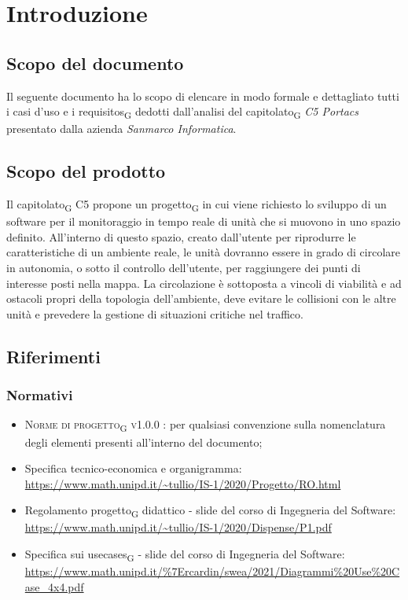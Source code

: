 \section{Introduzione}
\subsection{Scopo del documento}
Il seguente documento ha lo scopo di elencare in modo formale e dettagliato tutti i casi d’uso e i \glspl{requisito}\textsubscript{G} dedotti dall’analisi del \gls{capitolato}\textsubscript{G} \textit{C5 Portacs} presentato dalla azienda \textit{Sanmarco Informatica}.

\subsection{Scopo del prodotto}
Il \gls{capitolato}\textsubscript{G} C5 propone un \gls{progetto}\textsubscript{G} in cui viene richiesto lo sviluppo di un software per il monitoraggio in tempo reale di unità che si muovono in uno spazio definito. All’interno di questo spazio, creato dall’utente per riprodurre le caratteristiche di un ambiente reale, le unità dovranno essere in grado di circolare in autonomia, o sotto il controllo dell’utente, per raggiungere dei punti di interesse posti nella mappa.  La circolazione è sottoposta a vincoli di viabilità e ad ostacoli propri della topologia dell’ambiente, deve evitare le collisioni con le altre unità e prevedere la gestione di situazioni critiche nel traffico.

\subsection{Riferimenti}
\subsubsection{Normativi}
\begin{itemize}
\item \textsc{Norme di \gls{progetto}\textsubscript{G} v1.0.0 }: per qualsiasi convenzione sulla nomenclatura degli elementi presenti all’interno del documento;
\item Specifica tecnico-economica e organigramma: \\ \url{https://www.math.unipd.it/~tullio/IS-1/2020/Progetto/RO.html}
\item Regolamento \gls{progetto}\textsubscript{G} didattico - slide del corso di Ingegneria del Software: \\ \url{https://www.math.unipd.it/~tullio/IS-1/2020/Dispense/P1.pdf}
\item Specifica sui \glspl{usecase}\textsubscript{G} - slide del corso di Ingegneria del Software: \\ \url{https://www.math.unipd.it/%7Ercardin/swea/2021/Diagrammi%20Use%20Case_4x4.pdf}
\end{itemize}
